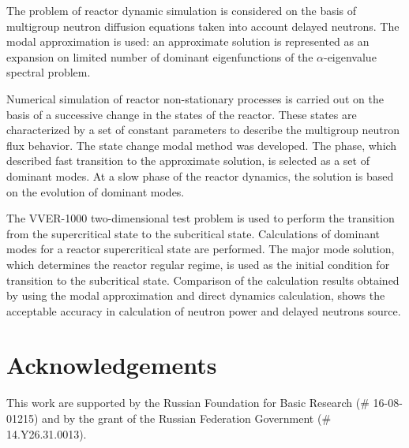 \documentclass[a4paper]{jpconf}
\begin{document}
The problem of reactor dynamic simulation is considered on the basis of multigroup neutron diffusion equations taken into account delayed neutrons.
The modal approximation is used: an approximate solution is represented as an expansion on limited number of dominant eigenfunctions of the $\alpha$-eigenvalue spectral problem.

Numerical simulation of reactor non-stationary processes is carried out on the basis of a successive change in the states of the reactor. These states are characterized by a set of constant parameters to describe the multigroup neutron flux behavior.
The state change modal method was developed. The phase, which described fast transition to the approximate solution, is selected as a set of dominant modes. At a slow phase of the reactor dynamics, the solution is based on the evolution of dominant modes.

The VVER-1000 two-dimensional test problem is used to perform the transition from the supercritical state to the subcritical state.
Calculations of dominant modes for a reactor supercritical state are performed. The major mode solution, which determines the reactor regular regime, is used as the initial condition for transition to the subcritical state. Comparison of the calculation results obtained by using the modal approximation and direct dynamics calculation, shows the acceptable accuracy in calculation of neutron power and delayed neutrons source.


\section*{Acknowledgements}
This work are supported by the Russian Foundation for Basic Research (\# 16-08-01215) and by the grant of the Russian Federation Government (\# 14.Y26.31.0013).
\end{document}
